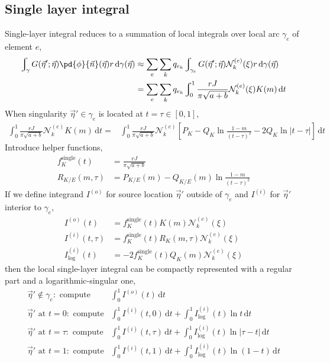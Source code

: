 \documentclass{jfm}
\begin{document}
\subsection{Single layer integral}
Single-layer integral reduces to a summation of local integrals over local arc $\gamma_e$ of element $e$,
\begin{align}
\nonumber\int_{\gamma}G(\vec{\eta}';\vec{\eta})
\pd{\phi}{\vec{n}}(\vec{\eta}) r \,\mathrm{d}\gamma(\vec{\eta})
&\approx\sum_e \sum_k q_{e_k}
\int_{\gamma_e}G(\vec{\eta}';\vec{\eta})\mathcal{N}^{(e)}_k(\xi) r \,\mathrm{d}\gamma(\vec{\eta})\\
&=\sum_e \sum_k q_{e_k}
\int_0^1\frac{ r J }{\pi \sqrt{a+b}}\mathcal{N}^{(e)}_k(\xi)K(m)\,\mathrm{d}t
\end{align}
When singularity $\vec{\eta}'\in \gamma_e$ is located at $t=\tau \in[0,1]$,
\begin{align*}
\int_0^1\frac{ r J }{\pi \sqrt{a+b}}\mathcal{N}^{(e)}_kK(m)\,\mathrm{d}t
=&\int_0^1\frac{ r J }{\pi \sqrt{a+b}}\mathcal{N}^{(e)}_k
\left[P_K -Q_K\ln\frac{1-m}{(t-\tau)^2}-2 Q_K\ln |t-\tau| \right]\,\mathrm{d}t
\end{align*}
Introduce helper functions,
\begin{align}
f_K^\mathrm{single}(t)&= \frac{ r J }{\pi \sqrt{a+b}} \\
R_{K/E}(m,\tau)&= P_{K/E}(m) -Q_{K/E}(m) \ln\frac{1-m}{(t-\tau)^2}
\end{align}
If we define integrand $I^{(o)}$ for source location $\vec{\eta}'$ outside of $\gamma_e$
and $I^{(i)}$ for $\vec{\eta}'$ interior to $\gamma_e$,
\begin{align}
I^{(o)}(t) &=  f_K^\mathrm{single}(t) K(m)\mathcal{N}^{(e)}_k(\xi)\\
I^{(i)}(t,\tau) &= f_K^\mathrm{single}(t)R_K(m,\tau)\mathcal{N}^{(e)}_k(\xi)\\
I^{(i)}_\mathrm{log}(t) &=-2 f_K^\mathrm{single} (t)Q_K(m) \mathcal{N}^{(e)}_k(\xi)
\end{align}
then the local single-layer integral can be compactly represented
with a regular part and a logarithmic-singular one,
\begin{align}
\vec{\eta}' \not\in \gamma_e:\,\,\textrm{compute}&\int_0^1I^{(o)}(t)\,\mathrm{d}t\\
\vec{\eta}' \textrm{ at } t= 0:\,\,\textrm{compute}&\int_0^1I^{(i)}(t,0)\,\mathrm{d}t+
\int_0^1I^{(i)}_\mathrm{log}(t)\ln t\,\mathrm{d}t\\
\vec{\eta}' \textrm{ at } t= \tau:\,\,\textrm{compute}&\int_0^1I^{(i)}(t,\tau)\,\mathrm{d}t+
\int_0^1I^{(i)}_\mathrm{log}(t)\ln|\tau-t|\,\mathrm{d}t\\
\vec{\eta}' \textrm{ at } t= 1:\,\,\textrm{compute}&\int_0^1I^{(i)}(t,1)\,\mathrm{d}t+
\int_0^1I^{(i)}_\mathrm{log}(t)\ln(1-t)\,\mathrm{d}t
\end{align}
\end{document}
